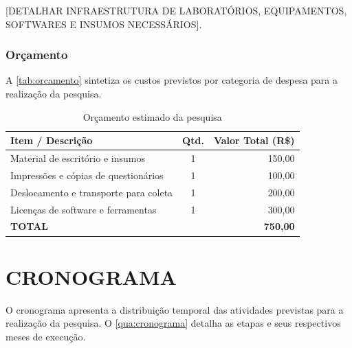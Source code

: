 [DETALHAR INFRAESTRUTURA DE LABORATÓRIOS, EQUIPAMENTOS, SOFTWARES E INSUMOS NECESSÁRIOS].

\subsection{Orçamento}
\label{subsec:orcamento}

A \autoref{tab:orcamento} sintetiza os custos previstos por categoria de despesa para a realização da pesquisa.

\begin{table}[htbp]
    \centering
    \caption{Orçamento estimado da pesquisa}
    \label{tab:orcamento}
    \begin{tabularx}{0.85\textwidth}{Xcr}
        \toprule
        \textbf{Item / Descrição} & \textbf{Qtd.} & \textbf{Valor Total (R\$)} \\
        \midrule
        Material de escritório e insumos & 1 & 150,00 \\
        Impressões e cópias de questionários & 1 & 100,00 \\
        Deslocamento e transporte para coleta & 1 & 200,00 \\
        Licenças de software e ferramentas & 1 & 300,00 \\
        \midrule
        \textbf{TOTAL} & & \textbf{750,00} \\
        \bottomrule
    \end{tabularx}
\end{table}


\chapter{CRONOGRAMA}
\label{chap:cronograma}

O cronograma apresenta a distribuição temporal das atividades previstas para a realização da pesquisa. O \autoref{qua:cronograma} detalha as etapas e seus respectivos meses de execução.


